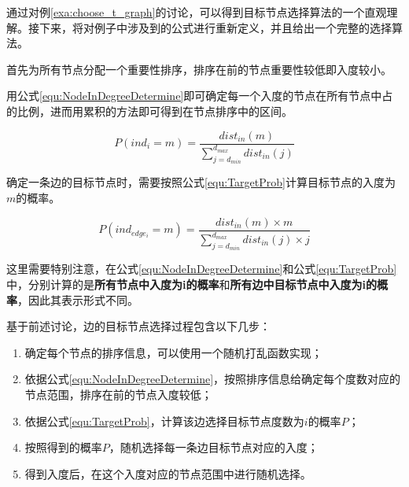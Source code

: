 通过对例\ref{exa:choose_t_graph}的讨论，可以得到目标节点选择算法的一个直观理解。接下来，将对例子中涉及到的公式进行重新定义，并且给出一个完整的选择算法。



首先为所有节点分配一个重要性排序，排序在前的节点重要性较低即入度较小。

用公式\ref{equ:NodeInDegreeDetermine}即可确定每一个入度的节点在所有节点中占的比例，进而用累积的方法即可得到在节点排序中的区间。

\vspace{-8mm}

\begin{equation}
  \label{equ:NodeInDegreeDetermine}
  P\left(ind_i=m\right)=\frac{dist_{in}(m)}{\sum\limits_{j=d_{min}}^{d_{max}}dist_{in}(j)}
\end{equation}

确定一条边的目标节点时，需要按照公式\ref{equ:TargetProb}计算目标节点的入度为$m$的概率。

\vspace{-8mm}

\begin{equation}
  \label{equ:TargetProb}
  P\left(ind_{edge_i}=m\right)=\frac{dist_{in}(m) \times m}{\sum\limits_{j=d_{min}}^{d_{max}}dist_{in}(j)\times j}
\end{equation}

这里需要特别注意，在公式\ref{equ:NodeInDegreeDetermine}和公式\ref{equ:TargetProb}中，分别计算的是\textbf{所有节点中入度为i的概率}和\textbf{所有边中目标节点中入度为i的概率}，因此其表示形式不同。

基于前述讨论，边的目标节点选择过程包含以下几步：

\begin{enumerate}
  \item 确定每个节点的排序信息，可以使用一个随机打乱函数实现；
  \item 依据公式\ref{equ:NodeInDegreeDetermine}，按照排序信息给确定每个度数对应的节点范围，排序在前的节点入度较低；
  \item 依据公式\ref{equ:TargetProb}，计算该边选择目标节点度数为$i$的概率$P$；
  \item 按照得到的概率$P$，随机选择每一条边目标节点对应的入度；
  \item 得到入度后，在这个入度对应的节点范围中进行随机选择。
\end{enumerate}

